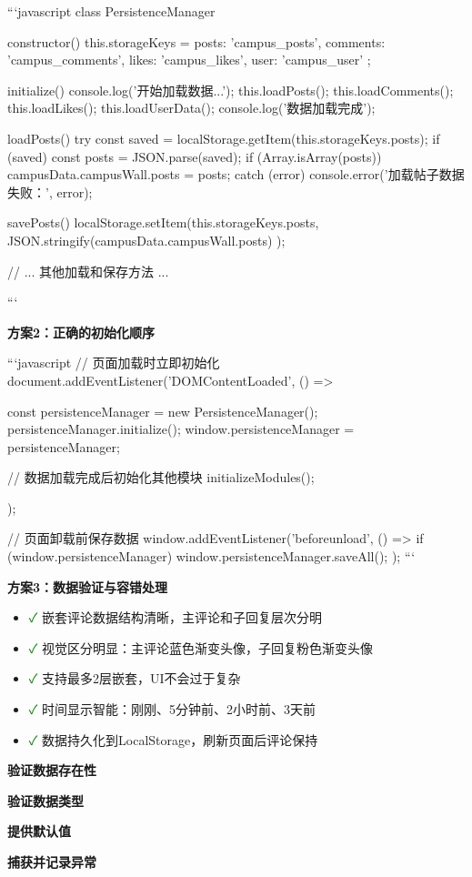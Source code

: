\documentclass[12pt,a4paper]{article}
\begin{document}
```javascript
class PersistenceManager {
  constructor() {
    this.storageKeys = {
      posts: 'campus_posts',
      comments: 'campus_comments',
      likes: 'campus_likes',
      user: 'campus_user'
    };
  }

  initialize() {
    console.log('开始加载数据...');
    this.loadPosts();
    this.loadComments();
    this.loadLikes();
    this.loadUserData();
    console.log('数据加载完成');
  }

  loadPosts() {
    try {
      const saved = localStorage.getItem(this.storageKeys.posts);
      if (saved) {
        const posts = JSON.parse(saved);
        if (Array.isArray(posts)) {
          campusData.campusWall.posts = posts;
        }
      }
    } catch (error) {
      console.error('加载帖子数据失败：', error);
    }
  }

  savePosts() {
    localStorage.setItem(this.storageKeys.posts, 
      JSON.stringify(campusData.campusWall.posts)
    );
  }

  // ... 其他加载和保存方法 ...
}
```

\textbf{方案2：正确的初始化顺序}

```javascript
// 页面加载时立即初始化
document.addEventListener('DOMContentLoaded', () => {
  const persistenceManager = new PersistenceManager();
  persistenceManager.initialize();
  window.persistenceManager = persistenceManager;

  // 数据加载完成后初始化其他模块
  initializeModules();
});

// 页面卸载前保存数据
window.addEventListener('beforeunload', () => {
  if (window.persistenceManager) {
    window.persistenceManager.saveAll();
  }
});
```

\textbf{方案3：数据验证与容错处理}

\begin{itemize}
    \item \textcolor{green}{✓} 嵌套评论数据结构清晰，主评论和子回复层次分明
    \item \textcolor{green}{✓} 视觉区分明显：主评论蓝色渐变头像，子回复粉色渐变头像
    \item \textcolor{green}{✓} 支持最多2层嵌套，UI不会过于复杂
    \item \textcolor{green}{✓} 时间显示智能：刚刚、5分钟前、2小时前、3天前
    \item \textcolor{green}{✓} 数据持久化到LocalStorage，刷新页面后评论保持
\end{itemize}

\textbf{验证数据存在性}
\item \textbf{验证数据类型}
\item \textbf{提供默认值}
\item \textbf{捕获并记录异常}
\end{document}
